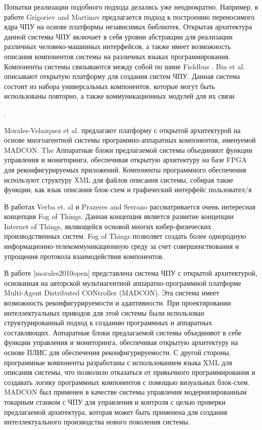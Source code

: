 Попытки реализации подобного подхода делались уже неоднократно. Например, в работе Grigoriev and Martinov предлагается подход к построению переносимого ядра ЧПУ на основе платформы независимых библиотек. Открытая архитектура данной системы ЧПУ включает в себя уровни абстракции для реализации различных человеко-машинных интерфейсов, а также имеет возможность описания компонентов системы на различных языках программирования. Компоненты системы связываются между собой по шине Fieldbus
.
Bin et al. описывают открытую платформу для создания систем ЧПУ. Данная система состоит из набора универсальных компонентов, которые могут быть использованы повторно, а также коммуникационных модулей для их связи%

.

Morales-Velazquez et al. предлагают платформу с открытой архитектурой на основе многоагентной системы программно-аппаратных компонентов, именуемой MADCON. The Аппаратные блоки предлагаемой системы объединяют функции управления и мониторинга, обеспечивая открытую архитектуру на базе FPGA для реконфигурируемых приложений. Компоненты программного обеспечения используют структуру XML для файлов описания системы, собирая такие функции, как язык описания блок-схем и графический интерфейс пользовател/я%

В работах Verba et. al
и  Prazeres and Serrano
рассматривается очень интересная концепция Fog of Things. Данная концепция является развитие концепции Internet of Things, являющейся основой многих кибер-физических производственных систем. Fog of Things позволяет создать более однородную информационно-телекоммуникационную среду за счет совершенствования и упрощения протокола взаимодействия компонентов.

В работе [morales2010open] представлена система ЧПУ с открытой архитектурой, основанная на авторской мультиагентной аппаратно-программной платформе Multi-Agent Distributed CONtroller (MADCON). Эта система имеет возможность реконфигурируемости и адаптивности. При проектировании интеллектуальных приводов для этой системы были использован структурированный подход к созданию программных и аппаратных составляющих. Аппаратные блоки предлагаемой системы объединяют в себе функции управления и мониторинга, обеспечивая открытую архитектуру на основе ПЛИС для обеспечения реконфигурируемости. С другой стороны, программные компоненты разработаны с использованием языка XML для описания системы, что позволило отказаться от привычного программирования и создавать логику программных компонентов с помощью визуальных блок-схем. MADCON был применен в качестве системы управления модернизированным токарным станком с ЧПУ для управления и контроля с целью проверки предлагаемой архитектура, которая может быть применена для создания интеллектуального производства нового поколения системы.

